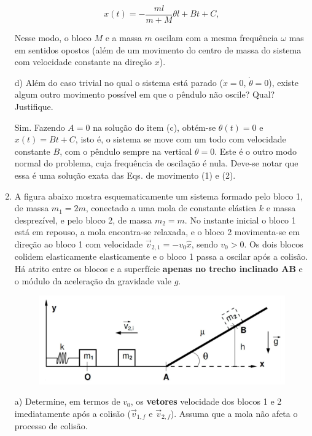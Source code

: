 \begin{enumerate}[start=1,label={\bfseries Q\arabic*.}]
$$
x(t) = -\frac{ml}{m+M} \theta l + Bt + C,
$$

Nesse modo, o bloco $M$ e a massa $m$ oscilam com a mesma frequência $\omega$ mas em sentidos opostos (além de um movimento do centro de massa do sistema com velocidade constante na direção $x$).



d) Além do caso trivial no qual o sistema está parado ($\dot{x} = 0$, $\dot{\theta} = 0$), existe algum outro movimento possível em que o pêndulo não oscile? Qual? Justifique.

\resposta

Sim. Fazendo $A = 0$ na solução do item (c), obtém-se $\theta(t) = 0$ e $x(t) = Bt + C$, isto é, o sistema se move com um todo com velocidade constante $B$, com o pêndulo sempre na vertical $\theta = 0$. Este é o outro modo normal do problema, cuja frequência de oscilação é nula. Deve-se notar que essa é uma solução exata das Eqs. de movimento (1) e (2).






\item A figura abaixo mostra esquematicamente um sistema formado pelo bloco 1, de massa $m_{1} = 2m$, conectado a uma mola de constante elástica $k$ e massa desprezível, e pelo bloco 2, de massa $m_{2} = m$. No instante inicial o bloco 1 está em repouso, a mola encontra-se relaxada, e o bloco 2 movimenta-se em direção ao bloco 1 com velocidade $\vec{v}_{2,1} = - v_{0} \hat{x}$, sendo $v_{0} > 0$. Os dois blocos colidem elasticamente elasticamente e o bloco 1 passa a oscilar após a colisão. Há atrito entre os blocos e a superfície \textbf{apenas no trecho inclinado AB} e o módulo da aceleração da gravidade vale $g$.

\begin{figure}[H]
\centering
\includegraphics[scale=0.5]{classica-img/inclinado.png}
\end{figure}


a) Determine, em termos de $v_{0}$, os \textbf{vetores} velocidade dos blocos 1 e 2 imediatamente após a colisão ($\vec{v}_{1,f}$ e $\vec{v}_{2,f}$). Assuma que a mola não afeta o processo de colisão.


\end{enumerate}
